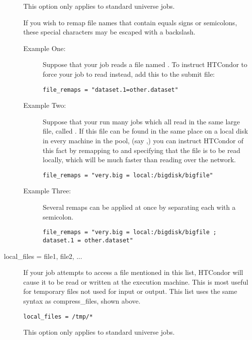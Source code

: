 \begin{description}
This option only applies to standard universe jobs.

If you wish to remap file names that contain equals signs or semicolons,
these special characters may be escaped with a backslash.

\begin{description}
\item[Example One:]
Suppose that your job reads a file named .
To instruct HTCondor
to force your job to read  instead,
add this to the submit file:
\begin{verbatim}
file_remaps = "dataset.1=other.dataset"
\end{verbatim}
\item[Example Two:]
Suppose that your run many jobs which all read in the same large file,
called .
If this file can be found in the same place on
a local disk in every machine in the pool,
(say ,) you can
instruct HTCondor of this fact by remapping  to
 and specifying that the file is to be read locally,
which will be much faster than reading over the network.
\begin{verbatim}
file_remaps = "very.big = local:/bigdisk/bigfile"
\end{verbatim}
\item[Example Three:]
Several remaps can be applied at once by separating each with a semicolon.
\footnotesize
\begin{verbatim}
file_remaps = "very.big = local:/bigdisk/bigfile ; dataset.1 = other.dataset"
\end{verbatim}
\normalsize
\end{description}



\label{condor-submit-local-files}
\item[local\_files = file1, file2, ...]

If your job attempts to access a file mentioned in this list,
HTCondor will cause it to be read or written at the execution machine.
This is most useful for temporary files not used for input or output.
This list uses the same syntax as compress\_files, shown above.

\begin{verbatim}
local_files = /tmp/*
\end{verbatim}

This option only applies to standard universe jobs.


\end{description}
